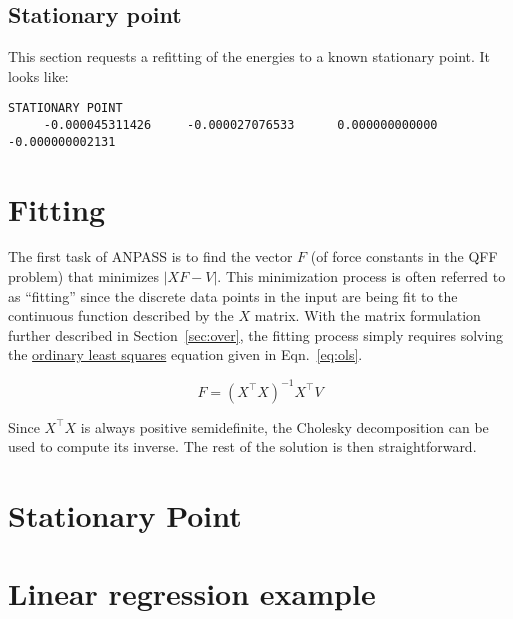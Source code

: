 \documentclass{article}
\begin{document}
\subsection{Stationary point}

This section requests a refitting of the energies to a known stationary point.
It looks like:

\begin{lstlisting}
STATIONARY POINT
     -0.000045311426     -0.000027076533      0.000000000000     -0.000000002131
\end{lstlisting}


\section{Fitting}

The first task of ANPASS is to find the vector $F$ (of force constants in the
QFF problem) that minimizes $|XF - V|$. This minimization process is often
referred to as ``fitting'' since the discrete data points in the input are being
fit to the continuous function described by the $X$ matrix. With the matrix
formulation further described in Section~\ref{sec:over}, the fitting process
simply requires solving the
\href{https://en.wikipedia.org/wiki/Ordinary_least_squares}{ordinary least
  squares} equation given in Eqn.~\ref{eq:ols}.

\begin{equation}
  \label{eq:ols}
  F = (X^\intercal X)^{-1}X^\intercal V
\end{equation}

Since $X^\intercal X$ is always positive semidefinite, the Cholesky
decomposition can be used to compute its inverse. The rest of the solution is
then straightforward.

\section{Stationary Point}

\appendix

\section{Linear regression example}
\end{document}
